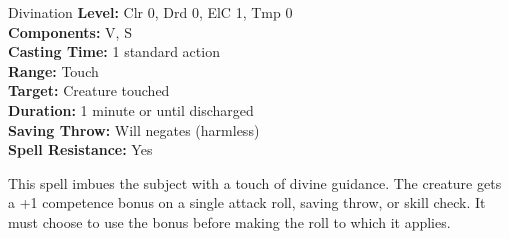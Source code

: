 {Divination}
{
	\textbf{Level:}
	Clr 0, Drd 0, ElC 1, Tmp 0\\
	\textbf{Components:}
	V, S\\
	\textbf{Casting Time:}
	1 standard action\\
	\textbf{Range:}
	Touch\\
	\textbf{Target:}
	Creature touched\\
	\textbf{Duration:}
	1 minute or until discharged\\
	\textbf{Saving Throw:}
	Will negates (harmless)\\
	\textbf{Spell Resistance:}
	Yes\\
}
{
	This spell imbues the subject with a touch of divine guidance. The creature gets a +1 competence bonus on a single attack roll, saving throw, or skill check. It must choose to use the bonus before making the roll to which it applies.

}
